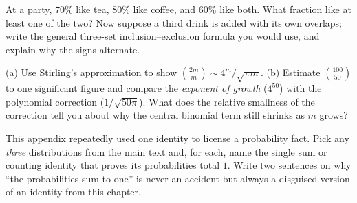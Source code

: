 \begin{exercise}
At a party, $70\%$ like tea, $80\%$ like coffee, and $60\%$ like both. What
fraction like at least one of the two? Now suppose a third drink is added with
its own overlaps; write the general three-set inclusion--exclusion formula you
would use, and explain why the signs alternate.
\end{exercise}

\begin{exercise}[Stirling]
(a) Use Stirling's approximation to show $\binom{2m}{m}\sim 4^m/\sqrt{\pi m}$.
(b) Estimate $\binom{100}{50}$ to one significant figure and compare the
\emph{exponent of growth} ($4^{50}$) with the polynomial correction
($1/\sqrt{50\pi}$). What does the relative smallness of the correction tell
you about why the central binomial term still shrinks as $m$ grows?
\end{exercise}

\begin{exercise}
This appendix repeatedly used one identity to license a probability fact.
Pick any \emph{three} distributions from the main text and, for each, name the
single sum or counting identity that proves its probabilities total $1$.
Write two sentences on why ``the probabilities sum to one'' is never an
accident but always a disguised version of an identity from this chapter.
\end{exercise}
